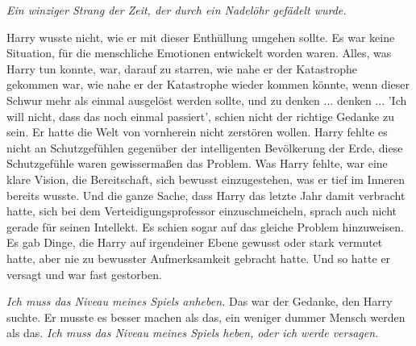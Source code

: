 \emph{Ein winziger Strang der Zeit, der durch ein Nadelöhr gefädelt wurde.}

Harry wusste nicht, wie er mit dieser Enthüllung umgehen sollte. Es war keine
Situation, für die menschliche Emotionen entwickelt worden waren. Alles, was
Harry tun konnte, war, darauf zu starren, wie nahe er der Katastrophe gekommen
war, wie nahe er der Katastrophe wieder kommen könnte, wenn dieser Schwur mehr
als einmal ausgelöst werden sollte, und zu denken ... denken ... 'Ich will nicht,
dass das noch einmal passiert', schien nicht der richtige Gedanke zu sein. Er
hatte die Welt von vornherein nicht zerstören wollen. Harry fehlte es nicht an
Schutzgefühlen gegenüber der intelligenten Bevölkerung der Erde, diese
Schutzgefühle waren gewissermaßen das Problem. Was Harry fehlte, war eine klare
Vision, die Bereitschaft, sich bewusst einzugestehen, was er tief im Inneren
bereits wusste. Und die ganze Sache, dass Harry das letzte Jahr damit verbracht
hatte, sich bei dem Verteidigungsprofessor einzuschmeicheln, sprach auch nicht
gerade für seinen Intellekt. Es schien sogar auf das gleiche Problem
hinzuweisen. Es gab Dinge, die Harry auf irgendeiner Ebene gewusst oder stark
vermutet hatte, aber nie zu bewusster Aufmerksamkeit gebracht hatte. Und so
hatte er versagt und war fast gestorben.

\emph{Ich muss das Niveau meines Spiels anheben.}
Das war der Gedanke, den Harry suchte. Er musste es besser machen als das, ein
weniger dummer Mensch werden als das.
\emph{Ich muss das Niveau meines Spiels heben, oder ich werde versagen.}

